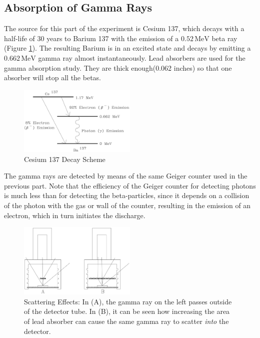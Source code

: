 \subsection{Absorption of Gamma Rays}
The source for this part of the experiment is Cesium 137, which decays with a half-life of 30 years to Barium 137 with the emission of a $0.52\, \mathrm{MeV}$ beta ray (Figure {\ref{fig:cesium}}). The resulting Barium is in an excited state and decays by emitting a $0.662\, \mathrm{MeV}$ gamma ray almost instantaneously. Lead absorbers are used for the gamma absorption study. They are thick enough(0.062 inches) so that one absorber will stop all the betas.\myskip
\begin{figure}[h]
\centering
\includegraphics[width=0.5\textwidth]{./Exp10/pic/image9.png}
\caption{Cesium 137 Decay Scheme}
\label{fig:cesium}
\end{figure}

The gamma rays are detected by means of the same Geiger counter used in the previous part. Note that the efficiency of the Geiger counter for detecting photons is much less than for detecting the beta-particles, since it depends on a collision of the photon with the gas or wall of the counter, resulting in the emission of an electron, which in turn initiates the discharge.\myskip
\begin{figure}[h]
\centering
\includegraphics[width=0.5\textwidth]{./Exp10/pic/image10.png}
\caption{Scattering Effects: In (A), the gamma ray on the left passes outside of the detector tube. In (B), it can be seen how increasing the area of lead absorber can cause the same gamma ray to scatter \emph{into} the detector.}
\label{fig:scattering}
\end{figure}

